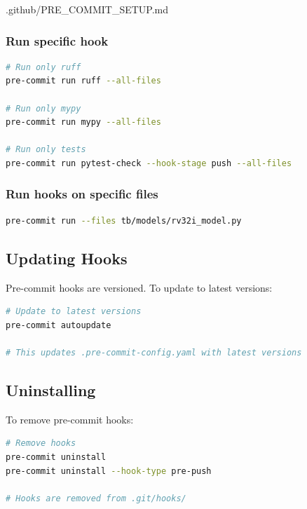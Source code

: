 \begin{relocated}{.github/PRE_COMMIT_SETUP.md}
\subsubsection{Run specific hook}\label{um:flow:pre-commit-setup:run-specific-hook}

\begin{lstlisting}[language=bash]
# Run only ruff
pre-commit run ruff --all-files

# Run only mypy
pre-commit run mypy --all-files

# Run only tests
pre-commit run pytest-check --hook-stage push --all-files
\end{lstlisting}

\subsubsection{Run hooks on specific files}\label{um:flow:pre-commit-setup:run-hooks-on-specific-files}

\begin{lstlisting}[language=bash]
pre-commit run --files tb/models/rv32i_model.py
\end{lstlisting}

\subsection{Updating Hooks}\label{um:flow:pre-commit-setup:updating-hooks}

Pre-commit hooks are versioned. To update to latest versions:

\begin{lstlisting}[language=bash]
# Update to latest versions
pre-commit autoupdate

# This updates .pre-commit-config.yaml with latest versions
\end{lstlisting}

\subsection{Uninstalling}\label{um:flow:pre-commit-setup:uninstalling}

To remove pre-commit hooks:

\begin{lstlisting}[language=bash]
# Remove hooks
pre-commit uninstall
pre-commit uninstall --hook-type pre-push

# Hooks are removed from .git/hooks/
\end{lstlisting}


\end{relocated}
